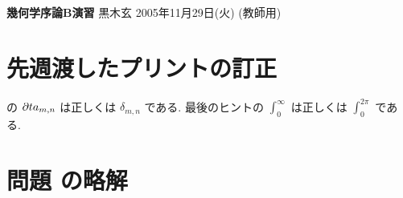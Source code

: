 \documentclass[12pt,twoside]{jarticle}
\newcommand\commentout[1]{#1}
\newcommand\commentout[1]{}
\begin{document}
\noindent
{\Large\bf 幾何学序論B演習}
\hfill
{\large 黒木玄}
\qquad
2005年11月29日(火)
\commentout{\quad (教師用)}
\tableofcontents

\section*{先週渡したプリントの訂正}

 の $\partial ta_{m,n}$ は正しくは $\delta_{m,n}$ である.
最後のヒントの $\int_0^\infty$ は正しくは $\int_0^{2\pi}$ である.

\section*{問題  の略解}
\end{document}
